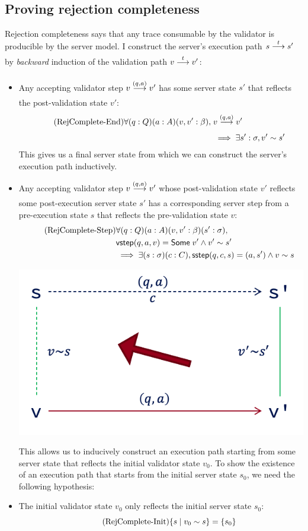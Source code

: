\subsection{Proving rejection completeness}
\label{sec:qac-completeness}
Rejection completeness says that any trace consumable by the validator is
producible by the server model.  I construct the server's execution path
$\behaves sts'$ by {\em backward} induction of the validation path $\behaves
vtv'$:
\begin{itemize}
\item Any accepting validator step $\behaves v{(q,a)}v'$ has some server
  state $s'$ that reflects the post-validation state $v'$:
  \begin{align*}
    \tag{RejComplete-End}
    \label{eq:rc1}
    \forall(q:Q)(a:A)(v, v':\beta),\;&\behaves v{(q,a)}v'\\
    &\implies\exists s':\sigma,\Reflects{v'}{s'} 
  \end{align*}
  This gives us a final server state from which we can construct the server's
  execution path inductively.

\item Any accepting validator step $\behaves v{(q,a)}v'$ whose
  post-validation state $v'$ reflects some post-execution server state $s'$
  has a corresponding server step from a pre-execution state $s$
  that reflects the pre-validation state $v$:
  \begin{align*}
    \tag{RejComplete-Step}
    \label{eq:rc2}
    &\forall(q:Q)(a:A)(v,v':\beta)(s':\sigma),\\
    &\mathsf{vstep}(q,a,v)=\mathsf{Some}\;v'\wedge v'\sim s'\\
    &\implies\exists(s:\sigma)(c:C),\mathsf{sstep}(q,c,s)=(a,s')\wedge v\sim s
  \end{align*}
  \begin{center}
    \includegraphics[width=.5\textwidth]{figures/complete}
  \end{center}
  This allows us to inducively construct an execution path starting from some
  server state that reflects the initial validator state $v_0$.  To show the
  existence of an execution path that starts from the initial server state
  $s_0$, we need the following hypothesis:

\item The initial validator state $v_0$ only reflects the initial server state $s_0$:
  \begin{equation}
    \tag{RejComplete-Init}
    \label{eq:rc3}
    \{s\mid v_0\sim s\}=\{s_0\}
  \end{equation}
\end{itemize}

